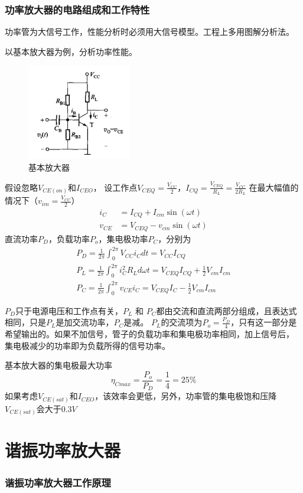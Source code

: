 \documentclass[10pt]{article}
\begin{document}
\section{功率放大器的电路组成和工作特性}
功率管为大信号工作，性能分析时必须用大信号模型。工程上多用图解分析法。
\begin{example}
    以基本放大器为例，分析功率性能。
\begin{figure}[H] %
 \centering %
 \includegraphics[width=0.4\textwidth]{pictures/2-2.png} %
 \caption{基本放大器} %
 \label{fig.1-1} %
 \end{figure}
假设忽略$V_{CE(on)}$和$I_{CEO}$，
设工作点$V_{CEQ} = \frac{V_{CC}}{2}$，$I_{CQ} = \frac{V_{CEQ}}{R_L} = \frac{V_{CC}}{2R_L}$ 
在最大幅值的情况下（$v_{im} = \frac{V_{CC}}{2}$）
\begin{align*}
    i_C &= I_{CQ} + I_{cm}\sin(\omega t) \\
    v_{CE} &= V_{CEQ} - v_{cm}\sin(\omega t)
\end{align*}
直流功率$P_D$，负载功率$P_o$，集电极功率$P_C$，分别为
\begin{align}
P_D = \frac{1}{2\pi}\int_{0}^{2\pi}V_{CC}i_{C}dt = V_{CC}I_{CQ}\\
P_L = \frac{1}{2\pi}\int_{0}^{2\pi}i_{C}^2R_L d\omega t  = V_{CEQ}I_{CQ}+\frac{1}{2}V_{cm}I_{cm}\\
P_C =  \frac{1}{2\pi}\int_{0}^{2\pi} v_{CE}i_{C} = V_{CEQ}I_{C}-\frac{1}{2}V_{cm}I_{cm}
\end{align}
\end{example}

$P_D$只于电源电压和工作点有关，$P_L$ 和 $P_C$都由交流和直流两部分组成，且表达式相同，只是$P_L$是加交流功率，$P_C$是减。
$P_L$的交流项为$P_o = \frac{P_D}{4}$，只有这一部分是希望输出的。如果不加信号，管子的负载功率和集电极功率相同，加上信号后，
集电极减少的功率即为负载所得的信号功率。\par
基本放大器的集电极最大功率
$$
\eta_{Cmax} = \frac{P_o}{P_D} = \frac{1}{4} = 25\%
$$
如果考虑$V_{CE(sat)}$和$I_{CEO}$，该效率会更低，另外，功率管的集电极饱和压降$V_{CE(sat)}$会大于$0.3V$
\newpage
\part{谐振功率放大器}
\section{谐振功率放大器工作原理}
\end{document}
